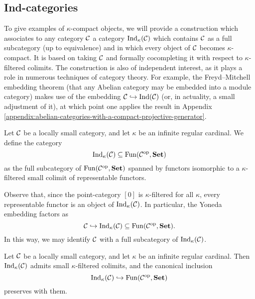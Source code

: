 \subsection{Ind-categories}
To give examples of \(\kappa\)-compact objects, we will provide a construction which associates to any category \(\mathcal{C}\) a category \(\operatorname{Ind}_\kappa(\mathcal{C})\) which contains \(\mathcal{C}\) as a full subcategory (up to equivalence)
and in which every object of \(\mathcal{C}\) becomes \(\kappa\)-compact. It is based on taking \(\mathcal{C}\) and formally cocompleting it with respect to \(\kappa\)-filtered colimits. The construction
is also of independent interest, as it plays a role in numerous techniques of category theory. For example, the Freyd--Mitchell embedding theorem (that any Abelian category may be embedded into
a module category) makes use of the embedding \(\mathcal{C}\hookrightarrow\operatorname{Ind}(\mathcal{C})\) (or, in actuality, a small adjustment of it), at which point one applies the result in Appendix \ref{appendix:abelian-categories-with-a-compact-projective-generator}.

\begin{definition}
	Let \(\mathcal{C}\) be a locally small category, and let \(\kappa\) be an infinite regular cardinal. We define the category
	\[ \operatorname{Ind}_\kappa(\mathcal{C}) \subseteq \operatorname{Fun}(\mathcal{C}^{\mathrm{op}},\mathbf{Set}) \]
	as the full subcategory of \(\operatorname{Fun}(\mathcal{C}^{\mathrm{op}},\mathbf{Set})\) spanned by functors isomorphic to a \(\kappa\)-filtered small colimit of representable functors.
\end{definition}
\begin{remark}
	Observe that, since the point-category \([0]\) is \(\kappa\)-filtered for all \(\kappa\), every representable functor is an object of \(\operatorname{Ind}_\kappa(\mathcal{C})\). In particular, the Yoneda embedding
	factors as
	\[ \mathcal{C} \hookrightarrow \operatorname{Ind}_\kappa(\mathcal{C}) \subseteq \operatorname{Fun}(\mathcal{C}^{\mathrm{op}},\mathbf{Set}). \]
	In this way, we may identify \(\mathcal{C}\) with a full subcategory of \(\operatorname{Ind}_\kappa(\mathcal{C})\).
\end{remark}
\begin{lemma}\label{lemma:ind-category-admits-filtered-colimits}
	Let \(\mathcal{C}\) be a locally small category, and let \(\kappa\) be an infinite regular cardinal. Then \(\operatorname{Ind}_\kappa(\mathcal{C})\) admits small \(\kappa\)-filtered colimits, and the canonical inclusion
	\[ \operatorname{Ind}_\kappa(\mathcal{C}) \hookrightarrow \operatorname{Fun}(\mathcal{C}^{\mathrm{op}},\mathbf{Set}) \]
	preserves with them.
\end{lemma}

